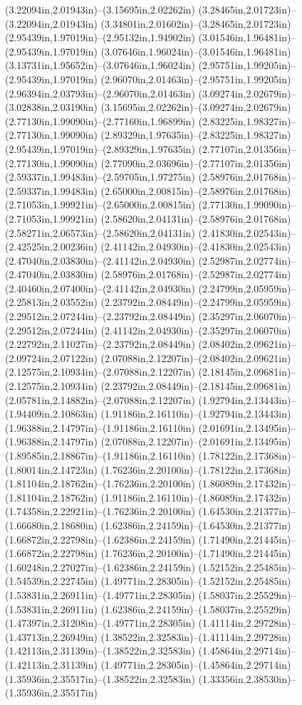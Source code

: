 (3.22094in,2.01943in)--(3.15695in,2.02262in) (3.28465in,2.01723in)--(3.22094in,2.01943in) (3.34801in,2.01602in)--(3.28465in,2.01723in) (2.95439in,1.97019in)--(2.95132in,1.94902in) (3.01546in,1.96481in)--(2.95439in,1.97019in) (3.07646in,1.96024in)--(3.01546in,1.96481in) (3.13731in,1.95652in)--(3.07646in,1.96024in) (2.95751in,1.99205in)--(2.95439in,1.97019in) (2.96070in,2.01463in)--(2.95751in,1.99205in) (2.96394in,2.03793in)--(2.96070in,2.01463in) (3.09274in,2.02679in)--(3.02838in,2.03190in) (3.15695in,2.02262in)--(3.09274in,2.02679in) (2.77130in,1.99090in)--(2.77160in,1.96899in) (2.83225in,1.98327in)--(2.77130in,1.99090in) (2.89329in,1.97635in)--(2.83225in,1.98327in) (2.95439in,1.97019in)--(2.89329in,1.97635in) (2.77107in,2.01356in)--(2.77130in,1.99090in) (2.77090in,2.03696in)--(2.77107in,2.01356in) (2.59337in,1.99483in)--(2.59705in,1.97275in) (2.58976in,2.01768in)--(2.59337in,1.99483in) (2.65000in,2.00815in)--(2.58976in,2.01768in) (2.71053in,1.99921in)--(2.65000in,2.00815in) (2.77130in,1.99090in)--(2.71053in,1.99921in) (2.58620in,2.04131in)--(2.58976in,2.01768in) (2.58271in,2.06573in)--(2.58620in,2.04131in) (2.41830in,2.02543in)--(2.42525in,2.00236in) (2.41142in,2.04930in)--(2.41830in,2.02543in) (2.47040in,2.03830in)--(2.41142in,2.04930in) (2.52987in,2.02774in)--(2.47040in,2.03830in) (2.58976in,2.01768in)--(2.52987in,2.02774in) (2.40460in,2.07400in)--(2.41142in,2.04930in) (2.24799in,2.05959in)--(2.25813in,2.03552in) (2.23792in,2.08449in)--(2.24799in,2.05959in) (2.29512in,2.07244in)--(2.23792in,2.08449in) (2.35297in,2.06070in)--(2.29512in,2.07244in) (2.41142in,2.04930in)--(2.35297in,2.06070in) (2.22792in,2.11027in)--(2.23792in,2.08449in) (2.08402in,2.09621in)--(2.09724in,2.07122in) (2.07088in,2.12207in)--(2.08402in,2.09621in) (2.12575in,2.10934in)--(2.07088in,2.12207in) (2.18145in,2.09681in)--(2.12575in,2.10934in) (2.23792in,2.08449in)--(2.18145in,2.09681in) (2.05781in,2.14882in)--(2.07088in,2.12207in) (1.92794in,2.13443in)--(1.94409in,2.10863in) (1.91186in,2.16110in)--(1.92794in,2.13443in) (1.96388in,2.14797in)--(1.91186in,2.16110in) (2.01691in,2.13495in)--(1.96388in,2.14797in) (2.07088in,2.12207in)--(2.01691in,2.13495in) (1.89585in,2.18867in)--(1.91186in,2.16110in) (1.78122in,2.17368in)--(1.80014in,2.14723in) (1.76236in,2.20100in)--(1.78122in,2.17368in) (1.81104in,2.18762in)--(1.76236in,2.20100in) (1.86089in,2.17432in)--(1.81104in,2.18762in) (1.91186in,2.16110in)--(1.86089in,2.17432in) (1.74358in,2.22921in)--(1.76236in,2.20100in) (1.64530in,2.21377in)--(1.66680in,2.18680in) (1.62386in,2.24159in)--(1.64530in,2.21377in) (1.66872in,2.22798in)--(1.62386in,2.24159in) (1.71490in,2.21445in)--(1.66872in,2.22798in) (1.76236in,2.20100in)--(1.71490in,2.21445in) (1.60248in,2.27027in)--(1.62386in,2.24159in) (1.52152in,2.25485in)--(1.54539in,2.22745in) (1.49771in,2.28305in)--(1.52152in,2.25485in) (1.53831in,2.26911in)--(1.49771in,2.28305in) (1.58037in,2.25529in)--(1.53831in,2.26911in) (1.62386in,2.24159in)--(1.58037in,2.25529in) (1.47397in,2.31208in)--(1.49771in,2.28305in) (1.41114in,2.29728in)--(1.43713in,2.26949in) (1.38522in,2.32583in)--(1.41114in,2.29728in) (1.42113in,2.31139in)--(1.38522in,2.32583in) (1.45864in,2.29714in)--(1.42113in,2.31139in) (1.49771in,2.28305in)--(1.45864in,2.29714in) (1.35936in,2.35517in)--(1.38522in,2.32583in) (1.33356in,2.38530in)--(1.35936in,2.35517in) 